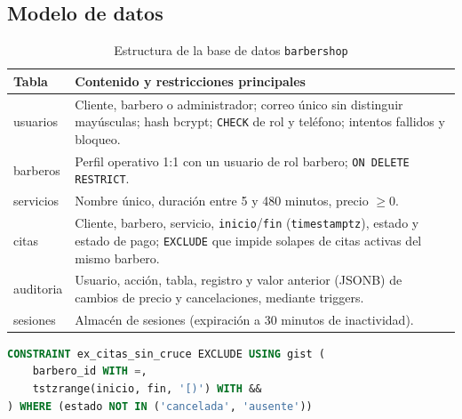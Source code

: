 \documentclass[12pt,a4paper,oneside]{article}
\begin{document}
\subsection{Modelo de datos}
\begin{table}[H]\centering\small
\begin{tabularx}{\textwidth}{>{\ttfamily}p{2.6cm}Y}\toprule
\textbf{Tabla} & \textbf{Contenido y restricciones principales}\\\midrule
usuarios & Cliente, barbero o administrador; correo \'unico sin distinguir may\'usculas; hash bcrypt; \texttt{CHECK} de rol y tel\'efono; intentos fallidos y bloqueo.\\
barberos & Perfil operativo 1:1 con un usuario de rol barbero; \texttt{ON DELETE RESTRICT}.\\
servicios & Nombre \'unico, duraci\'on entre 5 y 480 minutos, precio $\geq 0$.\\
citas & Cliente, barbero, servicio, \texttt{inicio}/\texttt{fin} (\texttt{timestamptz}), estado y estado de pago; \texttt{EXCLUDE} que impide solapes de citas activas del mismo barbero.\\
auditoria & Usuario, acci\'on, tabla, registro y valor anterior (JSONB) de cambios de precio y cancelaciones, mediante triggers.\\
sesiones & Almac\'en de sesiones (expiraci\'on a 30 minutos de inactividad).\\\bottomrule
\end{tabularx}
\caption{Estructura de la base de datos \texttt{barbershop}}\end{table}

\begin{lstlisting}[language=SQL,caption={Restricci\'on que aplica RN-01, RN-13 y RNF-13 en la base de datos}]
CONSTRAINT ex_citas_sin_cruce EXCLUDE USING gist (
    barbero_id WITH =,
    tstzrange(inicio, fin, '[)') WITH &&
) WHERE (estado NOT IN ('cancelada', 'ausente'))
\end{lstlisting}
\end{document}
